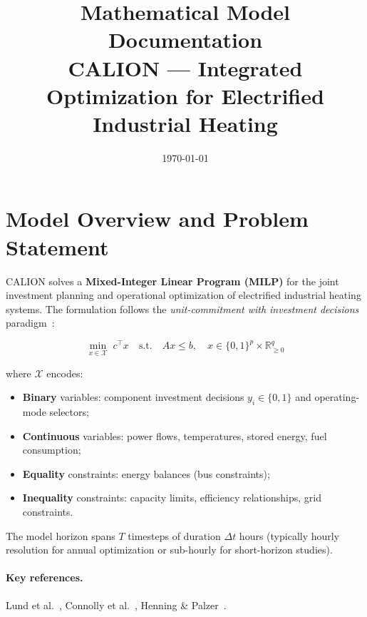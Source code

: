 \documentclass[a4paper,12pt]{article}
\begin{document}
\title{Mathematical Model Documentation\\[0.5em]
       \large CALION — Integrated Optimization for Electrified Industrial Heating}
\author{}
\date{\today}
\maketitle
\tableofcontents
\newpage

\section{Model Overview and Problem Statement}
\label{sec:overview}

CALION solves a \textbf{Mixed-Integer Linear Program (MILP)} for the joint investment planning
and operational optimization of electrified industrial heating systems. The formulation follows the
\emph{unit-commitment with investment decisions} paradigm~\cite{Morales2014,Savelsbergh1994}:

\begin{equation}
  \min_{x \in \mathcal{X}} \; c^{\top} x
  \quad \text{s.t.} \quad
  Ax \leq b,\quad x \in \{0,1\}^{p} \times \mathbb{R}^{q}_{\geq 0}
  \label{eq:MILP-general}
\end{equation}

where $\mathcal{X}$ encodes:
\begin{itemize}
  \item \textbf{Binary} variables: component investment decisions $y_{i} \in \{0,1\}$ and
        operating-mode selectors;
  \item \textbf{Continuous} variables: power flows, temperatures, stored energy, fuel consumption;
  \item \textbf{Equality} constraints: energy balances (bus constraints);
  \item \textbf{Inequality} constraints: capacity limits, efficiency relationships, grid constraints.
\end{itemize}

The model horizon spans $T$ timesteps of duration $\Delta t$ hours (typically hourly resolution for
annual optimization or sub-hourly for short-horizon studies).

\paragraph{Key references.} Lund et al.~\cite{Lund2014}, Connolly et al.~\cite{Connolly2014},
Henning \& Palzer~\cite{Henning2014}.
\end{document}
